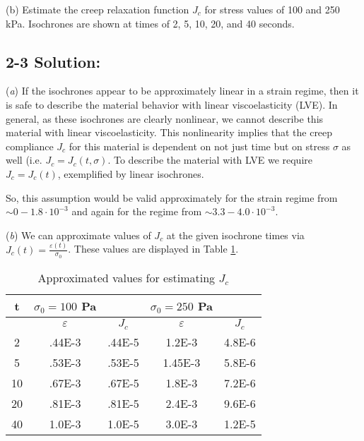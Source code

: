 \medskip
(b) Estimate the creep relaxation function $J_c$ for stress values of 100 and 250 kPa. Isochrones are shown at times of 2, 5, 10, 20, and 40 seconds.   

\subsection*{\textbf{2-3 Solution:}}
(\textit{a}) If the isochrones appear to be approximately linear in a strain regime, then it is safe to describe the material behavior with linear viscoelasticity (LVE). In general, as these isochrones are clearly nonlinear, we cannot describe this material with linear viscoelasticity. This nonlinearity implies that the creep compliance $J_c$ for this material is dependent on not just time but on stress $\sigma$ as well (i.e. $J_c=J_c(t,\sigma)$. To describe the material with LVE we require $J_c=J_c(t)$, exemplified by linear isochrones.

So, this assumption would be valid approximately for the strain regime from $\sim 0-1.8\cdot10^{-3}$ and again for the regime from $\sim 3.3-4.0\cdot10^{-3}$.

(\textit{b}) We can approximate values of $J_c$ at the given isochrone times via $J_c(t)=\frac{\varepsilon(t)}{\sigma_0}$. These values are displayed in Table \ref{tab:2-3Sol}. 

\begin{table}[h!]
    \centering
    \begin{tabular}{|c|c|c|c|c|}
    \hline
        t & $\sigma_0=100$ Pa &  & $\sigma_0=250$ Pa & \\
        \hline
         & $\varepsilon$ & $J_c$ & $\varepsilon$ & $J_c$\\
         \hline
        2 & .44E-3 & .44E-5 & 1.2E-3 & 4.8E-6\\
        5 & .53E-3 & .53E-5 & 1.45E-3 & 5.8E-6\\
        10 & .67E-3 & .67E-5 & 1.8E-3 & 7.2E-6\\
        20 & .81E-3 & .81E-5 & 2.4E-3 & 9.6E-6\\
        40 & 1.0E-3 & 1.0E-5 & 3.0E-3 & 1.2E-5\\
        \hline
    \end{tabular}
    \caption{Approximated values for estimating $J_c$}
    \label{tab:2-3Sol}
\end{table}

